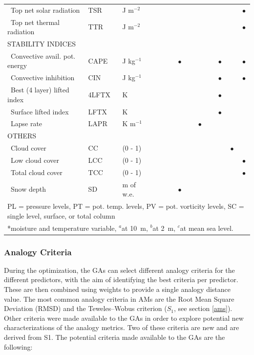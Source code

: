 \documentclass[draft]{agujournal2019}
\begin{document}
\begin{table}[!htbp]
{\begin{tabular}{lll|cccc|cccc|cc}
		\ Top net solar radiation & TSR & J m$^{-2}$ &  &  &  &  &  &  &  & & & $\bullet$ \\
		\ Top net thermal radiation & TTR & J m$^{-2}$ &  &  &  &  &  &  &  & & & $\bullet$ \\
		\hline
		\multicolumn{3}{l|}{\uppercase{Stability indices}} & & & & & & & & & & \\
		\ Convective avail. pot. energy & CAPE & J kg$^{-1}$ &  &  &  & $\bullet$ &  &  &  & $\bullet$ & & $\bullet$ \\
		\ Convective inhibition & CIN & J kg$^{-1}$ &  &  &  &  &  &  &  & $\bullet$ & & $\bullet$ \\
		\ Best (4 layer) lifted index & 4LFTX & K &  &  &  &  &  &  &  & $\bullet$ & & \\
		\ Surface lifted index & LFTX & K &  &  &  &  &  &  &  & $\bullet$ & & \\
		\ Lapse rate & LAPR & K m$^{-1}$ &  &  &  &  &  & $\bullet$ &  &  & & \\
		\hline
		\multicolumn{3}{l|}{\uppercase{Others}} & & & & & & & & & & \\
		\ Cloud cover & CC & (0 - 1) &  &  &  &  &  &  &  &  & $\bullet$ & \\
		\ Low cloud cover & LCC & (0 - 1) &  &  &  &  &  &  &  &  & & $\bullet$ \\
		\ Total cloud cover & TCC & (0 - 1) &  &  &  &  &  &  &  &  &  & $\bullet$ \\
		\ Snow depth & SD & m of w.e. &  &  &  & $\bullet$ &  &  &  &  & & \\
		\hline
		\multicolumn{13}{l}{PL = pressure levels, PT = pot. temp. levels, PV = pot. vorticity levels, SC = single level, surface, or total column} \\
		\multicolumn{13}{l}{*moisture and temperature variable, $^{a}$at 10~m, $^{b}$at 2~m, $^{c}$at mean sea level.}\\
		\hline 
	\end{tabular}}
	\label{list_variables}
\end{table}


\subsubsection{Analogy Criteria}
\label{criteria}

During the optimization, the GAs can select different analogy criteria for the different predictors, with the aim of identifying the best criteria per predictor. These are then combined using weights to provide a single analogy distance value. The most common analogy criteria in AMs are the Root Mean Square Deviation (RMSD) and the Teweles--Wobus criterion ($S_{1}$, see section \ref{ams}). Other criteria were made available to the GAs in order to explore potential new characterizations of the analogy metrics. Two of these criteria are new and are derived from S1. The potential criteria made available to the GAs are the following:
\end{document}
